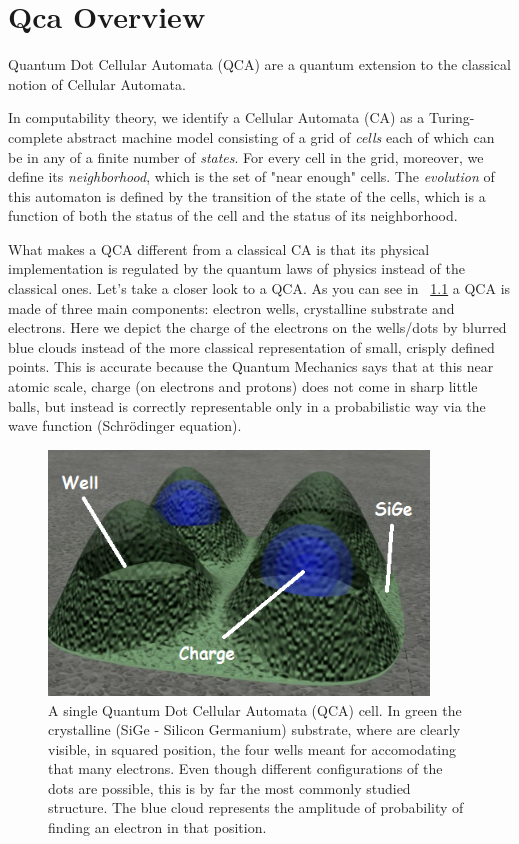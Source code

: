 \chapter{Qca Overview}\label{sec:qca}

Quantum Dot Cellular Automata (QCA) are a quantum extension to the classical notion of Cellular Automata. 

In computability theory, we identify a Cellular Automata (CA) as a Turing-complete abstract machine model consisting of a grid of \textsl{cells} each of which can be in any of a finite number of \textsl{states}. For every cell in the grid, moreover, we define its \textsl{neighborhood}, which is the set of "near enough" cells. The \textsl{evolution} of this automaton is defined by the transition of the state of the cells, which is a function of both the status of the cell and the status of its neighborhood.

What makes a QCA different from a classical CA is that its physical implementation is regulated by the quantum laws of physics instead of the classical ones. Let's take a closer look to a QCA. As you can see in \figurename~\ref{fig:qca} a QCA is made of three main components: electron wells, crystalline substrate and electrons. Here we depict the charge of the electrons on the wells/dots by blurred blue clouds instead of the more classical representation of small, crisply defined points. This is accurate because the Quantum Mechanics says that at this near atomic scale, charge (on electrons and protons) does not come in sharp little balls, but instead is correctly representable only in a probabilistic way via the wave function (Schr\"{o}dinger equation).

\begin{figure}[h!bt]
	\centerline{\includegraphics[width=0.9\textwidth]{img/qca.png}}
	\caption{A single Quantum Dot Cellular Automata (QCA) cell. In green the crystalline (SiGe - Silicon Germanium) substrate, where are clearly visible, in squared position, the four wells meant for accomodating that many electrons. Even though different configurations of the dots are possible, this is by far the most commonly studied structure. The blue cloud represents the amplitude of probability of finding an electron in that position.}
	\label{fig:qca}
\end{figure}

